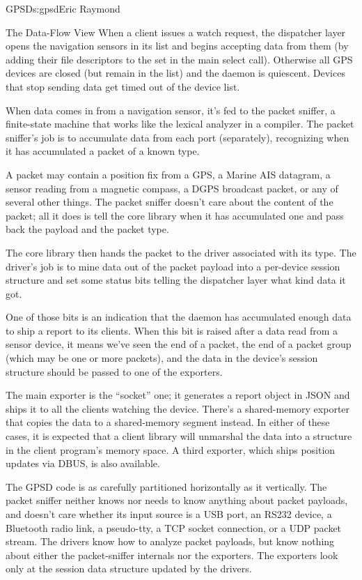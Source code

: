 \begin{aosachapter}{GPSD}{s:gpsd}{Eric Raymond}
\begin{aosasect1}{The Data-Flow View}
When a client issues a watch request, the dispatcher layer opens the
navigation sensors in its list and begins accepting data from them (by
adding their file descriptors to the set in the main select
call). Otherwise all GPS devices are closed (but remain in the list)
and the daemon is quiescent. Devices that stop sending data get timed
out of the device list.

When data comes in from a navigation sensor, it's fed to the packet
sniffer, a finite-state machine that works like the lexical analyzer
in a compiler.  The packet sniffer's job is to accumulate data from
each port (separately), recognizing when it has accumulated a packet
of a known type.

A packet may contain a position fix from a GPS, a Marine AIS datagram,
a sensor reading from a magnetic compass, a DGPS broadcast packet, or any
of several other things.  The packet sniffer doesn't care about the 
content of the packet; all it does is tell the core library when it
has accumulated one and pass back the payload and the packet type.

The core library then hands the packet to the driver associated with
its type.  The driver's job is to mine data out of the packet payload
into a per-device session structure and set some status bits telling
the dispatcher layer what kind data it got.

One of those bits is an indication that the daemon has accumulated
enough data to ship a report to its clients.  When this bit is raised
after a data read from a sensor device, it means we've seen the end of
a packet, the end of a packet group (which may be one or more
packets), and the data in the device's session structure should be
passed to one of the exporters.

The main exporter is the ``socket'' one; it generates a report object
in JSON and ships it to all the clients watching the device. There's a
shared-memory exporter that copies the data to a shared-memory segment
instead. In either of these cases, it is expected that a client
library will unmarshal the data into a structure in the client
program's memory space.  A third exporter, which ships position
updates via DBUS, is also available.

The GPSD code is as carefully partitioned horizontally as it
vertically.  The packet sniffer neither knows nor needs to know
anything about packet payloads, and doesn't care whether its input
source is a USB port, an RS232 device, a Bluetooth radio link, a
pseudo-tty, a TCP socket connection, or a UDP packet stream.  The
drivers know how to analyze packet payloads, but know nothing about
either the packet-sniffer internals nor the exporters.  The exporters
look only at the session data structure updated by the drivers.


\end{aosasect1}
\end{aosachapter}
